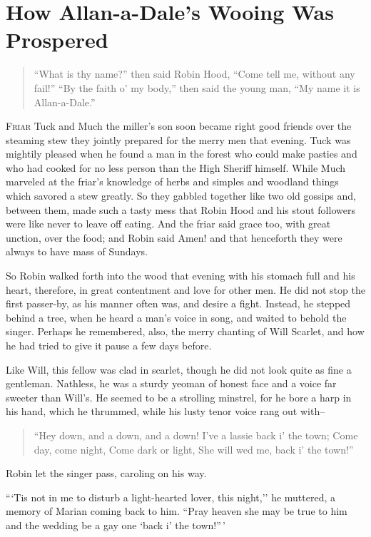\chapter{How Allan-a-Dale’s Wooing Was Prospered}

\begin{quote}
“What is thy name?” then said Robin Hood,
“Come tell me, without any fail!”
“By the faith o’ my body,” then said the young man,
“My name it is Allan-a-Dale.”
\end{quote}

\lettrine{F}{riar} Tuck and Much the miller's son soon became right good friends over
the steaming stew they jointly prepared for the merry men that evening.
Tuck was mightily pleased when he found a man in the forest who could
make pasties and who had cooked for no less person than the High Sheriff
himself. While Much marveled at the friar's knowledge of herbs and
simples and woodland things which savored a stew greatly. So they
gabbled together like two old gossips and, between them, made such a
tasty mess that Robin Hood and his stout followers were like never to
leave off eating. And the friar said grace too, with great unction, over
the food; and Robin said Amen! and that henceforth they were always to
have mass of Sundays.

So Robin walked forth into the wood that evening with his stomach full
and his heart, therefore, in great contentment and love for other men.
He did not stop the first passer-by, as his manner often was, and desire
a fight. Instead, he stepped behind a tree, when he heard a man's voice
in song, and waited to behold the singer. Perhaps he remembered, also,
the merry chanting of Will Scarlet, and how he had tried to give it
pause a few days before.

Like Will, this fellow was clad in scarlet, though he did not look quite
as fine a gentleman. Nathless, he was a sturdy yeoman of honest face and
a voice far sweeter than Will's. He seemed to be a strolling minstrel,
for he bore a harp in his hand, which he thrummed, while his lusty tenor
voice rang out with--

\begin{quote}
“Hey down, and a down, and a down!
I’ve a lassie back i’ the town;
Come day, come night, Come dark or light,
She will wed me, back i’ the town!”
\end{quote}

Robin let the singer pass, caroling on his way.

```Tis not in me to disturb a light-hearted lover, this night,'' he
muttered, a memory of Marian coming back to him. ``Pray heaven she may
be true to him and the wedding be a gay one `back i' the town!''\,'

